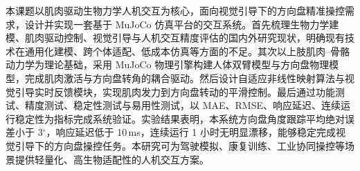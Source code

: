 \begin{abstractzh}

本课题以肌肉驱动生物力学人机交互为核心，面向视觉引导下的方向盘精准操控需求，设计并实现一套基于 MuJoCo 仿真平台的交互系统。首先梳理生物力学建模、肌肉驱动控制、视觉引导与人机交互精度评估的国内外研究现状，明确现有技术在通用化建模、跨个体适配、低成本仿真等方面的不足。其次以上肢肌肉--骨骼动力学为理论基础，采用 MuJoCo 物理引擎构建人体双臂模型与方向盘物理模型，完成肌肉激活与方向盘转角的耦合驱动。然后设计自适应非线性映射算法与视觉引导实时反馈模块，实现肌肉发力到方向盘转动的平滑控制。最后通过功能测试、精度测试、稳定性测试与易用性测试，以 MAE、RMSE、响应延迟、连续运行稳定性为指标完成系统验证。实验结果表明，本系统方向盘角度跟踪平均绝对误差小于 3$^\circ$，响应延迟低于 10\,ms，连续运行 1 小时无明显漂移，能够稳定完成视觉引导下的方向盘操控任务。本研究可为驾驶模拟、康复训练、工业协同操控等场景提供轻量化、高生物适配性的人机交互方案。

\end{abstractzh}